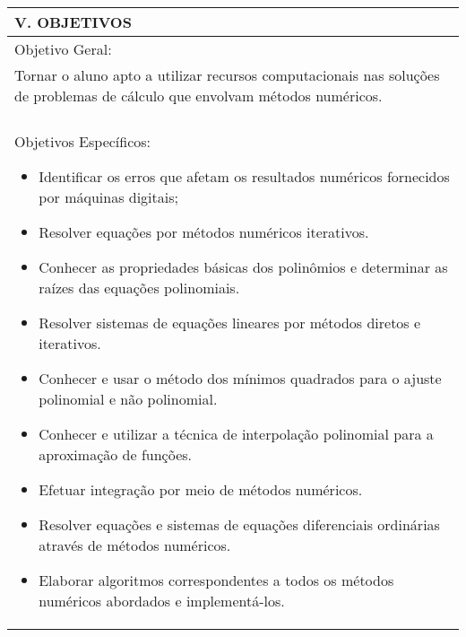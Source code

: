 \documentclass[12pt]{article}
\begin{document}
\begin{longtable}{|L{1.025\textwidth}|} \hline
%
{\bf V. OBJETIVOS } \\ \hline
%
Objetivo Geral:\\

Tornar o aluno apto a utilizar recursos computacionais nas soluções de problemas de cálculo que envolvam métodos numéricos.\\
\\
Objetivos Específicos: 
\begin{itemize}
\item Identificar os erros que afetam os resultados numéricos fornecidos por máquinas digitais;
\item Resolver equações por métodos numéricos iterativos.
\item Conhecer as propriedades básicas dos polinômios e determinar as raízes das equações polinomiais.
\item  Resolver sistemas de equações lineares por métodos diretos e iterativos.
\item Conhecer e usar o método dos mínimos quadrados para o ajuste polinomial e não polinomial.
\item Conhecer e utilizar a técnica de interpolação polinomial para a aproximação de funções.
\item Efetuar integração por meio de métodos numéricos.
\item Resolver equações e sistemas de equações diferenciais ordinárias através de métodos numéricos.
\item Elaborar algoritmos correspondentes a todos os métodos numéricos abordados e implementá-los.
\end{itemize}
\\ \hline
\end{longtable}
\end{document}
